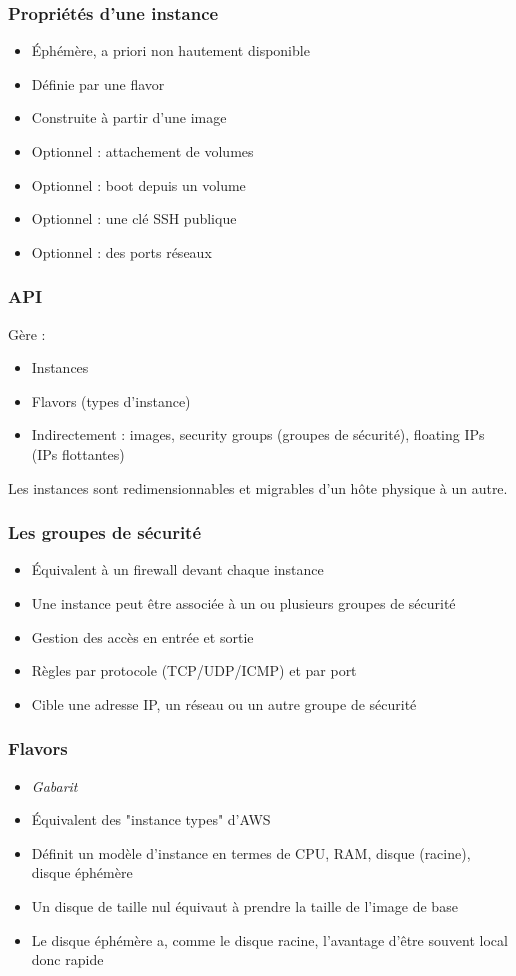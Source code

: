   \begin{frame}
    \frametitle{Propriétés d'une instance}
    \begin{itemize}
      \item Éphémère, a priori non hautement disponible
      \item Définie par une flavor
      \item Construite à partir d'une image
      \item Optionnel : attachement de volumes
      \item Optionnel : boot depuis un volume
      \item Optionnel : une clé SSH publique
      \item Optionnel : des ports réseaux
    \end{itemize}
  \end{frame}

  \begin{frame}
    \frametitle{API}
    Gère :
    \begin{itemize}
      \item Instances
      \item Flavors (types d'instance)
      \item Indirectement : images, security groups (groupes de sécurité), floating IPs (IPs flottantes)
    \end{itemize}
    Les instances sont redimensionnables et migrables d'un hôte physique à un autre.
  \end{frame}

  \begin{frame}
    \frametitle{Les groupes de sécurité}
    \begin{itemize}
      \item Équivalent à un firewall devant chaque instance
      \item Une instance peut être associée à un ou plusieurs groupes de sécurité
      \item Gestion des accès en entrée et sortie
      \item Règles par protocole (TCP/UDP/ICMP) et par port
      \item Cible une adresse IP, un réseau ou un autre groupe de sécurité
    \end{itemize}
  \end{frame}

  \begin{frame}
    \frametitle{Flavors}
    \begin{itemize}
      \item \textit{Gabarit}
      \item Équivalent des "instance types" d'AWS
      \item Définit un modèle d'instance en termes de CPU, RAM, disque (racine), disque éphémère
      \item Un disque de taille nul équivaut à prendre la taille de l'image de base
      \item Le disque éphémère a, comme le disque racine, l'avantage d'être souvent local donc rapide
    \end{itemize}
  \end{frame}

